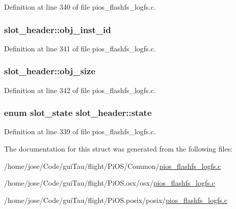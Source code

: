 Definition at line 340 of file pios\-\_\-flashfs\-\_\-logfs.\-c.

\hypertarget{structslot__header_a61928fad0e752c278fb8485aa199240d}{
\subsubsection[{obj\-\_\-inst\-\_\-id}]{ slot\-\_\-header\-::obj\-\_\-inst\-\_\-id}}\label{structslot__header_a61928fad0e752c278fb8485aa199240d}


Definition at line 341 of file pios\-\_\-flashfs\-\_\-logfs.\-c.

\hypertarget{structslot__header_ada9f3086c54142732ee8e98e88a65d3a}{
\subsubsection[{obj\-\_\-size}]{ slot\-\_\-header\-::obj\-\_\-size}}\label{structslot__header_ada9f3086c54142732ee8e98e88a65d3a}


Definition at line 342 of file pios\-\_\-flashfs\-\_\-logfs.\-c.

\hypertarget{structslot__header_a5bfcf2f73ad00e1f416dd3b9a557b7a3}{
\subsubsection[{state}]{\setlength{\rightskip}{0pt plus 5cm}enum {\bf slot\-\_\-state} slot\-\_\-header\-::state}}\label{structslot__header_a5bfcf2f73ad00e1f416dd3b9a557b7a3}


Definition at line 339 of file pios\-\_\-flashfs\-\_\-logfs.\-c.



The documentation for this struct was generated from the following files\-:\begin{DoxyCompactItemize}
\item 
/home/jose/\-Code/gui\-Tau/flight/\-Pi\-O\-S/\-Common/\hyperlink{_common_2pios__flashfs__logfs_8c}{pios\-\_\-flashfs\-\_\-logfs.\-c}\item 
/home/jose/\-Code/gui\-Tau/flight/\-Pi\-O\-S.\-osx/osx/\hyperlink{osx_2osx_2pios__flashfs__logfs_8c}{pios\-\_\-flashfs\-\_\-logfs.\-c}\item 
/home/jose/\-Code/gui\-Tau/flight/\-Pi\-O\-S.\-posix/posix/\hyperlink{posix_2posix_2pios__flashfs__logfs_8c}{pios\-\_\-flashfs\-\_\-logfs.\-c}\end{DoxyCompactItemize}
